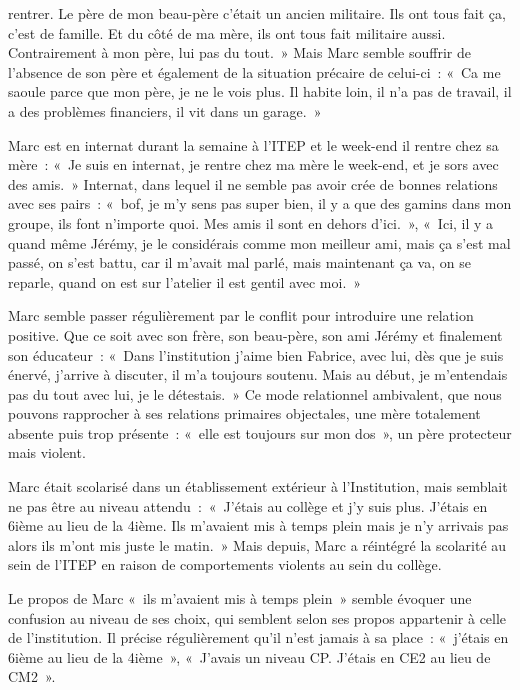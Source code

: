 \documentclass[12pt, a4paper]{book}
\begin{document}
\begin{spacing}{1.5}
rentrer. Le père de mon beau-père c'était un ancien militaire. Ils ont tous fait ça, c'est de famille. Et du côté de ma mère, ils ont tous fait militaire aussi. Contrairement à mon père, lui pas du tout. »  Mais Marc semble souffrir de l'absence de son père et également de la situation précaire de celui-ci : « Ca me saoule parce que mon père, je ne le vois plus. Il habite loin, il n'a pas de travail, il a des problèmes financiers, il vit dans un garage. »

Marc est en internat durant la semaine à l'ITEP et le week-end il rentre chez sa mère : « Je suis en internat, je rentre chez ma mère le week-end, et je sors avec des amis. » Internat, dans lequel il ne semble pas avoir crée de bonnes relations avec ses pairs : « bof, je m'y sens pas super bien, il y a que des gamins dans mon groupe, ils font n'importe quoi. Mes amis il sont en dehors d'ici. », « Ici, il y a quand même Jérémy, je le considérais comme mon meilleur ami, mais ça s'est mal passé, on s'est battu, car il m'avait mal parlé, mais maintenant ça va, on se reparle, quand on est sur l'atelier il est gentil avec moi. » 

Marc semble passer régulièrement par le conflit pour introduire une relation positive. Que ce soit avec son frère, son beau-père, son ami Jérémy et finalement son éducateur : « Dans l'institution j'aime bien Fabrice, avec lui, dès que je suis énervé, j'arrive à discuter, il m'a toujours soutenu. Mais au début, je m'entendais pas du tout avec lui, je le détestais. » Ce mode relationnel ambivalent, que nous pouvons rapprocher à ses relations primaires objectales, une mère totalement absente puis trop présente : « elle est toujours sur mon dos », un père protecteur mais violent. 

Marc était scolarisé dans un établissement extérieur à l'Institution, mais semblait ne pas être au niveau attendu : « J'étais au collège et j'y suis plus. J'étais en 6ième au lieu de la 4ième. Ils m'avaient mis à temps plein mais je n'y arrivais pas alors ils m'ont mis juste le matin. » Mais depuis, Marc a réintégré la scolarité au sein de l'ITEP en raison de comportements violents au sein du collège. 

Le propos de Marc « ils m'avaient mis à temps plein » semble évoquer une confusion au niveau de ses choix, qui semblent selon ses propos appartenir à celle de l'institution. Il précise régulièrement qu'il n'est jamais à sa place : « j'étais en 6ième au lieu de la 4ième », « J'avais un niveau CP. J'étais en CE2 au lieu de CM2 ».


\end{spacing}
\end{document}

